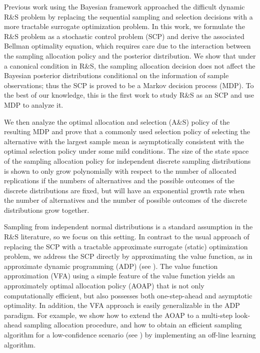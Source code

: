 \documentclass[journal]{IEEEtran}
\begin{document}
Previous work using the Bayesian framework approached the difficult dynamic R\&S problem by replacing the sequential sampling and selection  decisions  with a more tractable surrogate optimization problem.
In this work, we formulate the R\&S problem as a stochastic control problem (SCP) and derive  the associated Bellman optimality equation, which requires care due to the interaction between the sampling allocation policy and the posterior distribution.
 We show that under a canonical condition in R\&S, the sampling allocation decision does not affect the Bayesian posterior distributions conditional on the information of sample observations; thus the SCP is proved to be a Markov decision process (MDP). To the best of our knowledge, this is the first work to study
 R\&S as an SCP and use MDP to analyze it.

We then analyze the optimal allocation and selection (A\&S) policy of the resulting MDP and prove that a commonly used selection policy of selecting the alternative with the largest sample mean is asymptotically consistent with the optimal selection policy under some mild conditions. The size of the state space of the sampling allocation policy for independent discrete sampling distributions is shown to only grow polynomially with respect to the number of allocated replications if the numbers of alternatives and the possible outcomes of the discrete distributions are fixed, but will have an exponential growth rate when the number of alternatives and the number of possible outcomes of the discrete distributions grow together. 

Sampling from independent normal distributions is a standard assumption in the R\&S literature, so we focus on this setting. 
In contrast to the usual approach of replacing the SCP with a tractable approximate surrogate (static) optimization problem,
we address the SCP directly by approximating the value function, as in approximate dynamic programming (ADP)  (see \cite{powell2007approximate}).
The value function approximation (VFA) using a simple feature of the value function yields an approximately optimal allocation policy (AOAP) that  is not only computationally efficient,  but also possesses both one-step-ahead and asymptotic optimality. In addition, the VFA approach is easily generalizable in the ADP paradigm. For example, we show how to extend the AOAP to a multi-step look-ahead sampling allocation procedure, and how to obtain an efficient sampling algorithm for a low-confidence scenario (see \cite{peng2016gradient}) by implementing an off-line learning algorithm. 
\end{document}
